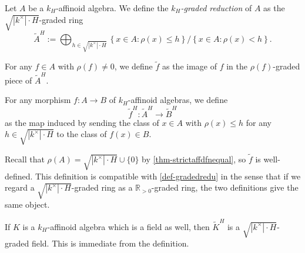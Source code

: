 \begin{definition}
    Let $A$ be a $k_H$-affinoid algebra. We define the \emph{$k_H$-graded reduction} of $A$ as the $\sqrt{|k^{\times}|\cdot H}$-graded ring
    \[
      \tilde{A}^H:=\bigoplus_{h\in \sqrt{|k^{\times}|\cdot H}}\left\{x\in A:\rho(x)\leq  h\right\}/\left\{x\in A:\rho(x)<  h\right\}.  
    \]

    For any $f\in A$ with $\rho(f)\neq 0$, we define $\tilde{f}$ as the image of $f$ in the $\rho(f)$-graded piece of $\tilde{A}^H$.

    For any morphism $f:A\rightarrow B$ of $k_H$-affinoid algebras, we define 
    \[
        \tilde{f}^H:  \tilde{A}^H\rightarrow \tilde{B}^H
    \]
    as the map induced by sending the class of $x\in A$ with $\rho(x)\leq h$ for any $h\in \sqrt{|k^{\times}|\cdot H}$ to the class of $f(x)\in B$.
\end{definition}
Recall that $\rho(A)=\sqrt{|k^{\times}|\cdot H}\cup\{0\}$ by \cref{thm-strictaffdfnequal}, so $\tilde{f}$ is well-defined. This definition is compatible with \cref{def-gradedredu} in the sense that if we regard a  $\sqrt{|k^{\times}|\cdot H}$-graded ring as a $\mathbb{R}_{>0}$-graded ring, the two definitions give the same object.

\begin{example}
    If $K$ is a $k_H$-affinoid algebra which is a field as well, then $\tilde{K}^H$ is a $\sqrt{|k^{\times}|\cdot H}$-graded field. This is immediate from the definition.
\end{example}



